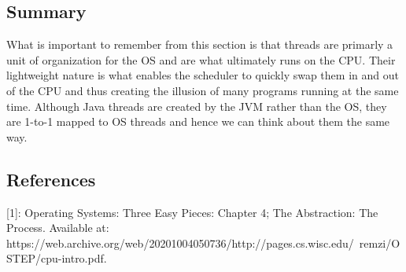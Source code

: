 \documentclass[main]{subfiles}
\begin{document}

\subsection{Summary}
What is important to remember from this section is that threads are primarly a unit of organization for the OS and are what ultimately runs on the CPU. Their lightweight nature is what enables the scheduler to quickly swap them in and out of the CPU and thus creating the illusion of many programs running at the same time. Although Java threads are created by the JVM rather than the OS, they are 1-to-1 mapped to OS threads and hence we can think about them the same way.

\subsection{References}
[1]: Operating Systems: Three Easy Pieces: Chapter 4; The Abstraction: The Process. Available at: https://web.archive.org/web/20201004050736/http://pages.cs.wisc.edu/~remzi/OSTEP/cpu-intro.pdf.

\end{document}
